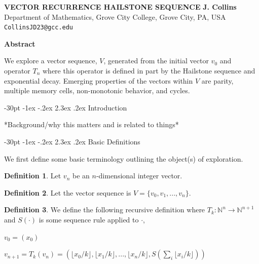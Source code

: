 \documentclass[10pt]{article}
\makeatletter
\renewcommand\section{\@startsection {section}{1}{\z@}
{-30pt \@plus -1ex \@minus -.2ex}
{2.3ex \@plus.2ex}
{\normalfont\normalsize\bfseries\boldmath}}
\theoremstyle{definition}
\newtheorem{definition}{Definition}
\makeatother
\begin{document}
\begin{center}
\uppercase{\bf \boldmath Vector Recurrence Hailstone Sequence}
\vskip 20pt
{\bf J. Collins}\\
{\smallit Department of Mathematics, Grove City College, Grove City, PA, USA}\\
{\tt CollinsJD23@gcc.edu}\\
\end{center}

\centerline{\bf Abstract}
\noindent
We explore a vector sequence, $V$, generated from the initial vector $v_0$ and operator $T_n$ where this operator is defined in part by the Hailstone sequence and exponential decay. Emerging properties of the vectors within $V$ are parity, multiple memory cells, non-monotonic behavior, and cycles.

\pagestyle{myheadings}
\thispagestyle{empty}
\baselineskip=12.875pt
\vskip 30pt

\section{Introduction}

*Background/why this matters and is related to things*

\section{Basic Definitions}

We first define some basic terminology outlining the object(s) of exploration.

\begin{definition}
    Let $v_n$ be an $n$-dimensional integer vector.
\end{definition}

\begin{definition}
    Let the vector sequence is $V=\{v_0,v_1,...,v_n\}$.
\end{definition}

\begin{definition}
    We define the following recursive definition where $T_k:\mathbb{N}^n \xrightarrow{} \mathbb{N}^{n+1}$ and $S(\cdot)$ is some sequence rule applied to $\cdot$,
    \begin{center}
        $v_0=(x_0)$
    
        $v_{n+1}=T_k(v_n)=(\lfloor x_0/k \rfloor, \lfloor x_1/k \rfloor,...,\lfloor x_n/k \rfloor, S(\sum_i \lfloor x_i/k \rfloor))$
    \end{center}
\end{definition}
\end{document}
